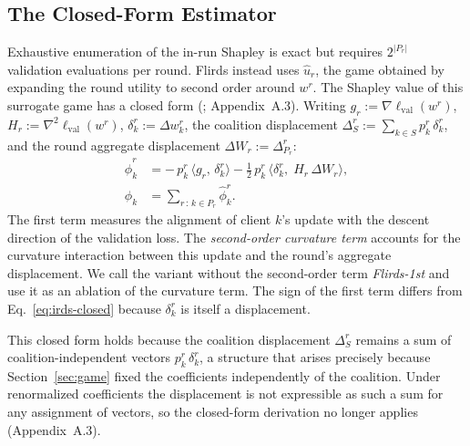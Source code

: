 \documentclass[letterpaper]{article} %
\theoremstyle{definition} %
\newcommand{\lval}{\ell_{\mathrm{val}}}
\begin{document}
\subsection{The Closed-Form Estimator}
\label{sec:estimator}

Exhaustive enumeration of the in-run Shapley is exact but requires
$2^{|P_r|}$ validation evaluations per round. Flirds instead uses
$\hat u_r$, the game obtained by expanding the round utility to second order
around $w^r$. The Shapley value of this surrogate game has a closed form
(\citealp{wang2025data}; Appendix~A.3). Writing
$g_r := \nabla \lval(w^r)$, $H_r := \nabla^2 \lval(w^r)$,
$\delta_k^r := \Delta w_k^r$, the coalition displacement
$\Delta_S^r := \sum_{k \in S} p_k^r\, \delta_k^r$, and the round aggregate displacement
$\Delta W_r := \Delta_{P_r}^r$:
\begin{equation}\label{eq:closed}
\begin{split}
\hat\phi_k^{r} &= -\,p_k^r\, \big\langle g_r,\, \delta_k^r \big\rangle - \tfrac{1}{2}\, p_k^r\, \big\langle \delta_k^r,\; H_r\, \Delta W_r \big\rangle, 
\\ 
\hat\phi_k &= \sum_{r\,:\,k\in P_r} \hat\phi_k^{r}.
\end{split}
\end{equation}
The first term measures the alignment of client $k$'s update with the descent
direction of the validation loss. The \emph{second-order curvature term}
accounts for the curvature interaction between this update and the round's
aggregate displacement. We call the variant without the second-order term
\emph{Flirds-1st} and use it as an ablation of the curvature term. The sign of
the first term differs from Eq.~\eqref{eq:irds-closed} because
$\delta_k^r$ is itself a displacement.

This closed form holds because the coalition displacement $\Delta_S^r$ remains
a sum of coalition-independent vectors $p_k^r\,\delta_k^r$, a structure that
arises precisely because Section~\ref{sec:game} fixed the coefficients
independently of the coalition. Under renormalized coefficients the displacement
is not expressible as such a sum for any assignment of vectors, so the
closed-form derivation no longer applies (Appendix~A.3).
\end{document}
